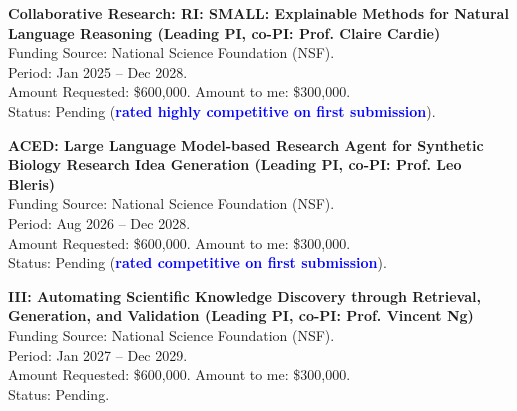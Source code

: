 \noindent \textbf{Collaborative Research: RI: SMALL: Explainable Methods for Natural Language Reasoning (Leading PI, co-PI: Prof. Claire Cardie)}  \\
\indent Funding Source: National Science Foundation (NSF). \\
\indent Period: Jan 2025 -- Dec 2028. \\
\indent Amount Requested: \$600,000. Amount to me: \$300,000. \\
\indent Status: Pending (\textbf{\textcolor{blue}{rated highly competitive on first submission}}).


\noindent \textbf{ACED: Large Language Model-based Research Agent for Synthetic Biology Research Idea Generation (Leading PI, co-PI: Prof. Leo Bleris)}  \\
\indent Funding Source: National Science Foundation (NSF). \\
\indent Period: Aug 2026 -- Dec 2028. \\ 
\indent Amount Requested: \$600,000. Amount to me: \$300,000. \\
\indent Status: Pending (\textbf{\textcolor{blue}{rated competitive on first submission}}).

\noindent \textbf{III: Automating Scientific Knowledge Discovery through Retrieval, Generation, and Validation (Leading PI, co-PI: Prof. Vincent Ng)}  \\
\indent Funding Source: National Science Foundation (NSF). \\
\indent Period: Jan 2027 -- Dec 2029. \\ 
\indent Amount Requested: \$600,000. Amount to me: \$300,000. \\
\indent Status: Pending. 


